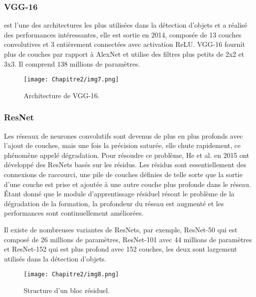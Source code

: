           \subsubsection{VGG-16} \cite{vgg_paper}
          est l'une des architectures les plus utilisées dans la détection d'objets et a 	réalisé des performances intéressantes, elle est sortie en 2014, composée de 13 couches convolutives et 3 entièrement connectées avec activation ReLU. VGG-16 fournit plus de couches par rapport à AlexNet et utilise des filtres plus petits de 2x2 et 3x3. Il comprend 138 millions de paramètres.
          \begin{figure}[H]
               \centering
               \texttt{[image: Chapitre2/img7.png]}
               \caption{Architecture de VGG-16.}
               \label{img7}
               \end{figure}

          \subsubsection{ResNet} \cite{res_paper}
          Les réseaux de neurones convolutifs sont devenus de plus en plus profonds avec l'ajout de couches, mais une fois la précision saturée, elle chute rapidement, ce phénomène appelé dégradation. Pour résoudre ce problème, He et al. en 2015 ont développé des ResNets basés sur les résidus. Les résidus sont essentiellement des connexions de raccourci, une pile de couches définies de telle sorte que la sortie d'une couche est prise et ajoutée à une autre couche plus profonde dans le réseau. Étant donné que le module d'apprentissage résiduel résout le problème de la dégradation de la formation, la profondeur du réseau est augmenté et les performances sont continuellement améliorées.

          Il existe de nombreuses variantes de ResNets, par exemple, ResNet-50 qui est composé de 26 millions de paramètres, ResNet-101 avec 44 millions de paramètres et ResNet-152 qui est plus profond avec 152 couches, les deux sont largement utilisés dans la détection d'objets.
          \begin{figure}[H]
               \centering
               \texttt{[image: Chapitre2/img8.png]}
               \caption{Structure d'un bloc résiduel.}
               \label{img8}
               \end{figure}
          
